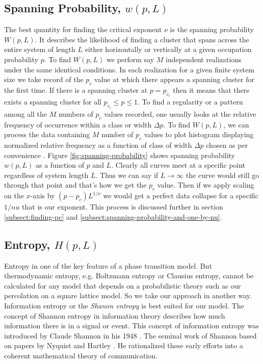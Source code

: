 	\subsection{Spanning Probability, $w(p,L)$}
	\label{subsect:spanning-probability}
	The best quantity for finding the critical exponent $\nu$	is the spanning probability $W(p,L)$. It describes the likelihood of finding a cluster that spans across the entire system of length $L$ either horizontally or vertically at a given occupation probability $p$. To find $W(p,L)$ we perform say $M$ independent realizations under the same identical conditions. In each realization for a given finite system size	we take record of the $p_c$ value at which there appears a	spanning cluster for the first time. If there is a spanning	cluster at $p=p_{c_i}$ then it means that there exists a spanning cluster for all $p_{c_i} \leq p \leq 1$. To find a regularity or a	pattern among all the $M$ numbers of $p_c$ values recorded,	one usually looks at the relative frequency of occurrence	within a class or width $\Delta p$. To find $W(p,L)$, we can process the data containing $M$ number of $p_c$ values to plot	histogram displaying normalized relative frequency as a	function of class of width $\Delta p$ chosen as per convenience	\cite{redefinition-of-site-percolation}. Figure \ref{fig:spanning-probability} shows spanning probability $w(p,L)$ as a function of $p$ and $L$. Clearly all curves meet at a specific point regardless of system length $L$. Thus we can say if $L \rightarrow \infty$ the curve would still go through that point and that's how we get the $p_c$ value. Then if we apply scaling on the $x$-axis by $(p-p_c)L^{1/\nu}$ we would get a perfect data collapse for a specific $1/nu$ that is our exponent. This process is discussed further in section \ref{subsect:finding-pc} and \ref{subsect:spanning-probability-and-one-by-nu}.



	\subsection{Entropy, $H(p,L)$} 
	\label{subsect:percolation-entropy}
	Entropy in one of the key feature of a phase transition model. But thermodynamic entropy, e.g. Boltzmann entropy or Clausius entropy, cannot be calculated for any model that depends on a probabilistic theory such as our percolation on a square lattice model. So we take our approach in another way. Information entropy or the \textit{Shanon entropy} is best suited for our model. The	concept of Shannon entropy in information theory describes how much information there is in	a signal or event. This concept of information entropy was introduced by Claude Shannon in his 1948 \cite{Shannon1948}. The seminal work of Shannon based on papers by	Nyquist \cite{Nyquist1924, Nyquist2002} and Hartley \cite{Hartley1928}. He rationalized these early efforts into a coherent mathematical	theory of communication.
	
